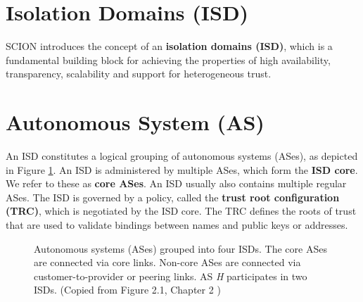 
\section{Isolation Domains (ISD)} \label{sec:isd}
SCION introduces the concept of an \textbf{isolation domains (ISD)}, which is a fundamental building block for achieving the properties of high availability, transparency, scalability and support for heterogeneous trust.

\section{Autonomous System (AS)} \label{sec:as}
An ISD constitutes a logical grouping of autonomous systems (ASes), as depicted in Figure \ref{fig:isd_as}. An ISD is administered by multiple ASes, which form the \textbf{ISD core}. We refer to these as \textbf{core ASes}. An ISD usually also contains multiple regular ASes. The ISD is governed by a policy, called the \textbf{trust root configuration (TRC)}, which is negotiated by the ISD core. The TRC defines the roots of trust that are used to validate bindings between names and public keys or addresses.

\begin{figure}[th!!]
\centering
\noindent
{}
\decoRule
\caption[ISD-AS representation inside SCION]{Autonomous systems (ASes) grouped into four ISDs. The core
ASes are connected via core links. Non-core ASes are connected
via customer-to-provider or peering links. AS \textit{H} participates in two
ISDs. (Copied from Figure 2.1, Chapter 2 \cite{PeSzReCh2017})}
\label{fig:isd_as}
\end{figure}

